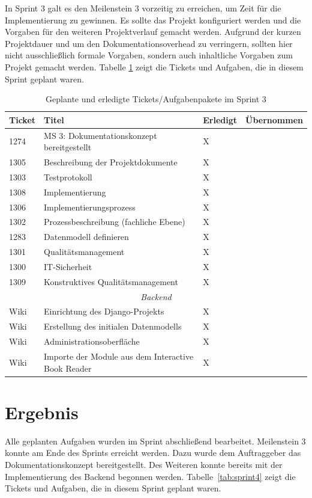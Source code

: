 \documentclass[a4paper,11pt,listof=numbered,glossary=totoc,parskip=half,toc=bib]{scrreprt}
\begin{document}
In Sprint 3 galt es den Meilenstein 3 vorzeitig zu erreichen, um Zeit für die Implementierung zu gewinnen. Es sollte das Projekt konfiguriert werden und die Vorgaben für den weiteren Projektverlauf gemacht werden. Aufgrund der kurzen Projektdauer und um den Dokumentationsoverhead zu verringern, sollten hier nicht ausschließlich formale Vorgaben, sondern auch inhaltliche Vorgaben zum Projekt gemacht werden. Tabelle \ref{tab:sprint3} zeigt die Tickets und Aufgaben, die in diesem Sprint geplant waren.

\begin{table}    
    \begin{tabularx}{\textwidth}{lXll}
			\toprule
			\textbf{Ticket} & \textbf{Titel} & \textbf{Erledigt} & \textbf{Übernommen} \\
			\midrule
1274	&	MS 3: Dokumentationskonzept bereitgestellt	&	X	&		\\
1305	&	Beschreibung der Projektdokumente	&	X	&		\\
1303	&	Testprotokoll	&	X	&		\\
1308	&	Implementierung	&	X	&		\\
1306	&	Implementierungsprozess	&	X	&		\\
1302	&	Prozessbeschreibung (fachliche Ebene)	&	X	&		\\
1283	&	Datenmodell definieren	&	X	&		\\
1301	&	Qualitätsmanagement	&	X	&		\\
1300	&	IT-Sicherheit	&	X	&		\\
1309	&	Konstruktives Qualitätsmanagement	&	X	&		\\
		\midrule
		\multicolumn{4}{c}{\textit{Backend}}\\
		\midrule
Wiki	&	Einrichtung des Django-Projekts	&	X	&		\\
Wiki	&	Erstellung des initialen Datenmodells	&	X	&		\\
Wiki	&	Administrationsoberfläche	&	X	&		\\
Wiki	&	Importe der Module aus dem Interactive Book Reader	&	X	&		\\

			\bottomrule
		\end{tabularx}
\caption{Geplante und erledigte Tickets/Aufgabenpakete im Sprint 3}
\label{tab:sprint3}
\end{table}
    
    \section{Ergebnis}
    Alle geplanten Aufgaben wurden im Sprint abschließend bearbeitet. Meilenstein 3 konnte am Ende des Sprints erreicht werden. Dazu wurde dem Auftraggeber das Dokumentationskonzept bereitgestellt. Des Weiteren konnte bereits mit der Implementierung des Backend begonnen werden. Tabelle~\ref{tab:sprint4} zeigt die Tickets und Aufgaben, die in diesem Sprint geplant waren.
    
\end{document}
